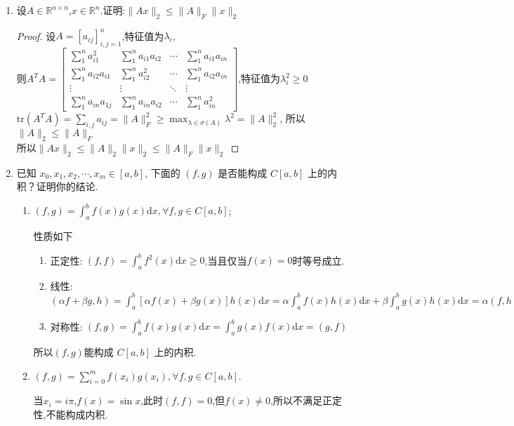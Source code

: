 \documentclass[a4paper]{article}
\begin{document}
\courseheader
{}

\begin{enumerate}
  \setlength{\itemsep}{3\parskip}

  \item 设$A\in\mathbb{R}^{n\times n}$,$x\in\mathbb{R}^{n}$.证明:$\|Ax\|_{2}\leq\|A\|_{F}\|x\|_{2}$
  \begin{proof}
    设$A=[a_{ij}]_{i,j=1}^{n}$,特征值为$\lambda_i$,\\则$A^TA=\begin{bmatrix}
      \sum_{1}^{n}a_{i1}^2&\sum_{1}^{n}a_{i1}a_{i2}&\cdots&\sum_{1}^{n}a_{i1}a_{in}\\
      \sum_{1}^{n}a_{i2}a_{i1}&\sum_{1}^{n}a_{i2}^2&\cdots&\sum_{1}^{n}a_{i2}a_{in}\\
      \vdots&\vdots&\ddots&\vdots\\
      \sum_{1}^{n}a_{in}a_{1j}&\sum_{1}^{n}a_{in}a_{i2}&\cdots&\sum_{1}^{n}a_{in}^2
      \end{bmatrix}$,特征值为$\lambda_i^2\ge0$\\
    $\mathrm{tr}(A^TA)=\sum_{i,j}a_{ij}=\|A\|_{F}^2\ge \max_{\lambda\in\sigma(A)}\lambda^2=\|A\|_{2}^2$, 所以$\|A\|_{2}\le\|A\|_{F}$\\
    所以$\|Ax\|_{2}\leq\|A\|_{2}\|x\|_{2}\leq\|A\|_{F}\|x\|_{2}$
  \end{proof}

  \item 已知 $x_0, x_1, x_2, \cdots, x_m \in [a, b]$, 下面的 $(f, g)$ 是否能构成 $C[a, b]$ 上的内积？证明你的结论.
  \begin{enumerate}[label=（\arabic*）]
    \item $(f,g)=\int_{a}^{b}f(x)g(x)\mathrm{d}x,\forall f,g\in C[a,b]$;
    \begin{solution}
      性质如下
      \begin{enumerate}[label=（\roman*）]
        \item 正定性: $(f,f)=\int_{a}^{b}f^2(x)\mathrm{d}x\ge 0$,当且仅当$f(x)=0$时等号成立.
        \item 线性: $(\alpha f+\beta g,h)=\int_{a}^{b}\left[\alpha f(x)+\beta g(x)\right]h(x)\mathrm{d}x=\alpha \int_{a}^{b}f(x)h(x)\mathrm{d}x+\beta \int_{a}^{b}g(x)h(x)\mathrm{d}x=\alpha (f,h)+\beta (g,h)$
        \item 对称性: $(f,g)=\int_{a}^{b}f(x)g(x)\mathrm{d}x=\int_{a}^{b}g(x)f(x)\mathrm{d}x=(g,f)$
      \end{enumerate}
      所以$(f,g)$能构成 $C[a, b]$ 上的内积.
    \end{solution}
    \item $(f,g)=\sum_{i=0}^{m}f(x_{i})g(x_{i}),\forall f,g\in C[a,b].$
    \begin{solution}
      当$x_i=i\pi$,$f(x)=\sin x$,此时$(f,f)=0$,但$f(x)\neq 0$,所以不满足正定性,不能构成内积.
    \end{solution}
  \end{enumerate}


\end{enumerate}
\end{document}

